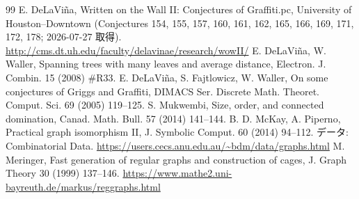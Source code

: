 \documentclass[paper=a4,fontsize=10.5pt,jafontsize=10.5pt]{jlreq}
\theoremstyle{plain}
\theoremstyle{definition}
\begin{document}
\begin{thebibliography}{99}
 E. DeLaViña, Written on the Wall II: Conjectures of Graffiti.pc, University of Houston--Downtown (Conjectures 154, 155, 157, 160, 161, 162, 165, 166, 169, 171, 172, 178; 2026-07-27 取得). \url{http://cms.dt.uh.edu/faculty/delavinae/research/wowII/}
 E. DeLaViña, W. Waller, Spanning trees with many leaves and average distance, Electron. J. Combin. 15 (2008) \#R33.
 E. DeLaViña, S. Fajtlowicz, W. Waller, On some conjectures of Griggs and Graffiti, DIMACS Ser. Discrete Math. Theoret. Comput. Sci. 69 (2005) 119--125.
 S. Mukwembi, Size, order, and connected domination, Canad. Math. Bull. 57 (2014) 141--144.
 B. D. McKay, A. Piperno, Practical graph isomorphism II, J. Symbolic Comput. 60 (2014) 94--112. データ: Combinatorial Data. \url{https://users.cecs.anu.edu.au/~bdm/data/graphs.html}
 M. Meringer, Fast generation of regular graphs and construction of cages, J. Graph Theory 30 (1999) 137--146. \url{https://www.mathe2.uni-bayreuth.de/markus/reggraphs.html}
\end{thebibliography}
\end{document}
